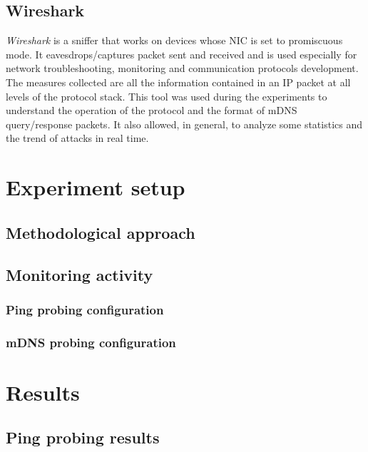 \documentclass[fleqn, 11pt]{SelfArx} %
\begin{document}
\subsection{Wireshark}
\textit{Wireshark} is a sniffer that works on devices whose NIC is set to promiscuous mode. It eavesdrops/captures packet sent and received and is used especially for network troubleshooting, monitoring and communication protocols development. The measures collected are all the information contained in an IP packet at all levels of the protocol stack. \newline
This tool was used during the experiments to understand the operation of the protocol and the format of mDNS query/response packets. \newline
It also allowed, in general, to analyze some statistics and the trend of attacks in real time.

\section{Experiment setup}
\subsection{Methodological approach}
\subsection{Monitoring activity}
\subsubsection{Ping probing configuration}
\subsubsection{mDNS probing configuration}


\section{Results}
\subsection{Ping probing results}
\end{document}
